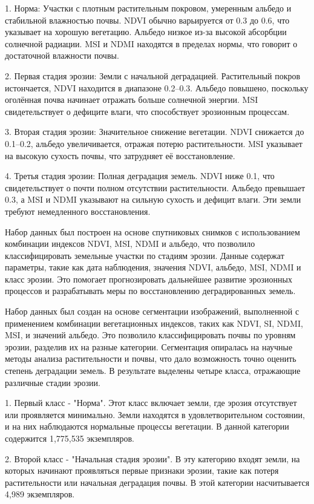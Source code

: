 \begin{multicols}{2}
1. Норма: Участки с плотным растительным покровом, умеренным
альбедо и стабильной влажностью почвы. NDVI обычно варьируется от 0.3
до 0.6, что указывает на хорошую вегетацию. Альбедо низкое из-за
высокой абсорбции солнечной радиации. MSI и NDMI находятся в пределах
нормы, что говорит о достаточной влажности почвы.

2. Первая стадия эрозии: Земли с начальной деградацией.
Растительный покров истончается, NDVI находится в диапазоне 0.2--0.3.
Альбедо повышено, поскольку оголённая почва начинает отражать больше
солнечной энергии. MSI свидетельствует о дефиците влаги, что
способствует эрозионным процессам.

3. Вторая стадия эрозии: Значительное снижение вегетации. NDVI
снижается до 0.1--0.2, альбедо увеличивается, отражая потерю
растительности. MSI указывает на высокую сухость почвы, что затрудняет
её восстановление.

4. Третья стадия эрозии: Полная деградация земель. NDVI ниже
0.1, что свидетельствует о почти полном отсутствии растительности.
Альбедо превышает 0.3, а MSI и NDMI указывают на сильную сухость и
дефицит влаги. Эти земли требуют немедленного восстановления.

Набор данных был построен на основе спутниковых снимков с использованием
комбинации индексов NDVI, MSI, NDMI и альбедо, что позволило
классифицировать земельные участки по стадиям эрозии. Данные содержат
параметры, такие как дата наблюдения, значения NDVI, альбедо, MSI, NDMI
и класс эрозии. Это помогает прогнозировать дальнейшее развитие
эрозионных процессов и разрабатывать меры по восстановлению
деградированных земель.

Набор данных был создан на основе сегментации изображений, выполненной с
применением комбинации вегетационных индексов, таких как NDVI, SI, NDMI,
MSI, и значений альбедо. Это позволило классифицировать почвы по уровням
эрозии, разделив их на разные категории. Сегментация опиралась на
научные методы анализа растительности и почвы, что дало возможность
точно оценить степень деградации земель. В результате выделены четыре
класса, отражающие различные стадии эрозии.

1. Первый класс - "Норма". Этот класс включает земли, где эрозия
отсутствует или проявляется минимально. Земли находятся в
удовлетворительном состоянии, и на них наблюдаются нормальные процессы
вегетации. В данной категории содержится 1,775,535 экземпляров.

2. Второй класс - "Начальная стадия эрозии". В эту категорию входят
земли, на которых начинают проявляться первые признаки эрозии, такие
как потеря растительности или начальная деградация почвы. В этой
категории насчитывается 4,989 экземпляров.


\end{multicols}
